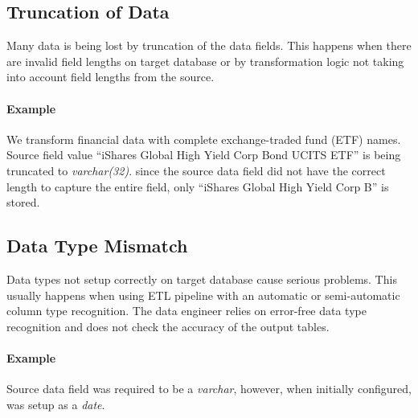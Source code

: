 \subsection*{Truncation of Data}

Many data is being lost by truncation of the data fields.
This happens when there are invalid field lengths on target database or by transformation logic not taking into account field lengths from the source.

\paragraph*{Example} We transform financial data with complete exchange-traded fund (ETF) names.
Source field value \enquote{iShares Global High Yield Corp Bond UCITS ETF} is being truncated to \textit{varchar(32)}.
since the source data field did not have the correct length to capture the entire field, only \enquote{iShares Global High Yield Corp B} is stored.


\subsection*{Data Type Mismatch}

Data types not setup correctly on target database cause serious problems.
This usually happens when using ETL pipeline with an automatic or semi-automatic column type recognition.
The data engineer relies on error-free data type recognition and does not check the accuracy of the output tables.

\paragraph*{Example} Source data field was required to be a \textit{varchar}, however, when initially configured, was setup as a \textit{date}.


